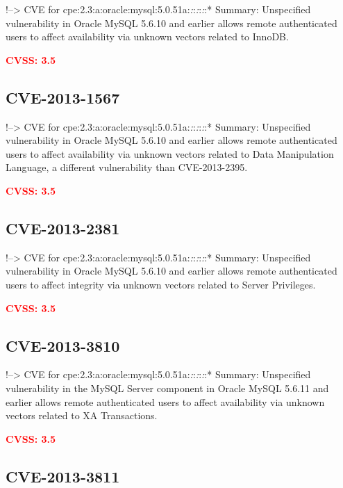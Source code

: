 \documentclass[a4paper, 12pt]{article}
\begin{document}
!--\textgreater{} CVE for
cpe:2.3:a:oracle:mysql:5.0.51a:\emph{:}:\emph{:}:\emph{:}:* Summary:
Unspecified vulnerability in Oracle MySQL 5.6.10 and earlier allows
remote authenticated users to affect availability via unknown vectors
related to InnoDB.

\textbf{\textcolor{red}{CVSS: 3.5}}

\hypertarget{cve-2013-1567}{%
\subsection{CVE-2013-1567}\label{cve-2013-1567}}

!--\textgreater{} CVE for
cpe:2.3:a:oracle:mysql:5.0.51a:\emph{:}:\emph{:}:\emph{:}:* Summary:
Unspecified vulnerability in Oracle MySQL 5.6.10 and earlier allows
remote authenticated users to affect availability via unknown vectors
related to Data Manipulation Language, a different vulnerability than
CVE-2013-2395.

\textbf{\textcolor{red}{CVSS: 3.5}}

\hypertarget{cve-2013-2381}{%
\subsection{CVE-2013-2381}\label{cve-2013-2381}}

!--\textgreater{} CVE for
cpe:2.3:a:oracle:mysql:5.0.51a:\emph{:}:\emph{:}:\emph{:}:* Summary:
Unspecified vulnerability in Oracle MySQL 5.6.10 and earlier allows
remote authenticated users to affect integrity via unknown vectors
related to Server Privileges.

\textbf{\textcolor{red}{CVSS: 3.5}}

\hypertarget{cve-2013-3810}{%
\subsection{CVE-2013-3810}\label{cve-2013-3810}}

!--\textgreater{} CVE for
cpe:2.3:a:oracle:mysql:5.0.51a:\emph{:}:\emph{:}:\emph{:}:* Summary:
Unspecified vulnerability in the MySQL Server component in Oracle MySQL
5.6.11 and earlier allows remote authenticated users to affect
availability via unknown vectors related to XA Transactions.

\textbf{\textcolor{red}{CVSS: 3.5}}

\hypertarget{cve-2013-3811}{%
\subsection{CVE-2013-3811}\label{cve-2013-3811}}
\end{document}
